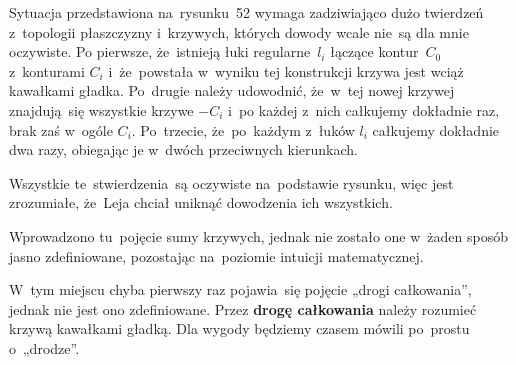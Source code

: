 \documentclass[a4paper,11pt]{article}
\begin{document}
\vspace{\spaceFour}





\noindent
{} Sytuacja przedstawiona na~rysunku~52 wymaga zadziwiająco dużo
twierdzeń z~topologii płaszczyzny i~krzywych, których dowody wcale nie~są
dla mnie oczywiste. Po pierwsze, że~istnieją łuki regularne~$l_{ i }$
łączące kontur~$C_{ 0 }$ z~konturami $C_{ i }$ i~że~powstała w~wyniku tej
konstrukcji krzywa jest wciąż kawałkami gładka. Po~drugie należy udowodnić,
że~w~tej nowej krzywej znajdują~się wszystkie krzywe $-C_{ i }$ i~po każdej
z~nich całkujemy dokładnie raz, brak zaś w~ogóle $C_{ i }$. Po~trzecie,
że~po~każdym z~łuków $l_{ i }$ całkujemy dokładnie dwa razy, obiegając je
w~dwóch przeciwnych kierunkach.

Wszystkie te~stwierdzenia~są oczywiste na~podstawie rysunku, więc
jest zrozumiałe, że~Leja chciał uniknąć dowodzenia ich wszystkich.

\vspace{\spaceFour}





\noindent
{} Wprowadzono tu~pojęcie sumy krzywych, jednak nie zostało one
w~żaden sposób jasno zdefiniowane, pozostając na~poziomie intuicji
matematycznej.

\vspace{\spaceFour}





\noindent
{} W~tym miejscu chyba pierwszy raz pojawia~się pojęcie „drogi
całkowania”, jednak nie jest ono zdefiniowane. Przez \textbf{drogę
  całkowania} należy rozumieć krzywą kawałkami gładką. Dla wygody będziemy
czasem mówili po~prostu o~„drodze”.

\vspace{\spaceFour}
\end{document}
